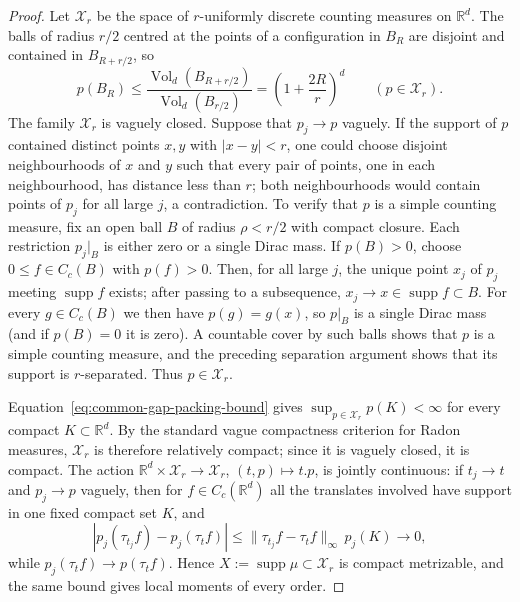 \documentclass[11pt,reqno,a4paper]{amsart}
\numberwithin{equation}{section}
\theoremstyle{compact}
\theoremstyle{definition}
\theoremstyle{definition}
\newcommand{\Vol}{\operatorname{Vol}}
\begin{document}
\begin{proof}
Let $\mathscr X_r$ be the space of $r$-uniformly discrete counting measures on
$\mathbb R^d$.  The balls of radius $r/2$ centred at the points of a
configuration in $B_R$ are disjoint and contained in $B_{R+r/2}$, so
\begin{equation}\label{eq:common-gap-packing-bound}
  p(B_R)\leq
  \frac{\Vol_d(B_{R+r/2})}{\Vol_d(B_{r/2})}
  =\left(1+\frac{2R}{r}\right)^d
  \qquad(p\in\mathscr X_r).
\end{equation}
The family $\mathscr X_r$ is vaguely closed.  Suppose that
$p_j\to p$ vaguely.  If the support of $p$ contained distinct points $x,y$
with $|x-y|<r$, one could choose disjoint neighbourhoods of $x$ and $y$ such
that every pair of points, one in each neighbourhood, has distance less than
$r$; both neighbourhoods would contain points of $p_j$ for all large $j$,
a contradiction.  To verify that $p$ is a simple counting measure, fix an
open ball $B$ of radius
$\rho<r/2$ with compact closure.  Each restriction $p_j|_B$ is either zero
or a single Dirac mass.  If $p(B)>0$, choose $0\leq f\in C_c(B)$ with
$p(f)>0$.  Then, for all large $j$, the unique point $x_j$ of $p_j$ meeting
$\operatorname{supp}f$ exists; after passing to a subsequence,
$x_j\to x\in\operatorname{supp}f\subset B$.  For every $g\in C_c(B)$ we then have
$p(g)=g(x)$, so $p|_B$ is a single Dirac mass (and if $p(B)=0$ it is zero).
A countable cover by such balls shows that $p$ is a simple counting measure,
and the preceding separation argument shows that its support is
$r$-separated.  Thus $p\in\mathscr X_r$.

Equation~\eqref{eq:common-gap-packing-bound} gives
$\sup_{p\in\mathscr X_r}p(K)<\infty$ for every compact
$K\subset\mathbb R^d$.  By the standard vague compactness criterion for
Radon measures, $\mathscr X_r$ is therefore relatively compact; since it is
vaguely closed, it is compact.  The action
$\mathbb R^d\times\mathscr X_r\to\mathscr X_r$, $(t,p)\mapsto t.p$, is
jointly continuous: if $t_j\to t$ and $p_j\to p$ vaguely, then for
$f\in C_c(\mathbb R^d)$ all the translates involved have support in one
fixed compact set $K$, and
\[
  |p_j(\tau_{t_j}f)-p_j(\tau_t f)|
  \leq \|\tau_{t_j}f-\tau_t f\|_\infty\,p_j(K)\longrightarrow0,
\]
while $p_j(\tau_t f)\to p(\tau_t f)$.
Hence $X:=\operatorname{supp}\mu\subset\mathscr X_r$ is compact metrizable,
and the same bound gives local moments of every order.


\end{proof}
\end{document}
